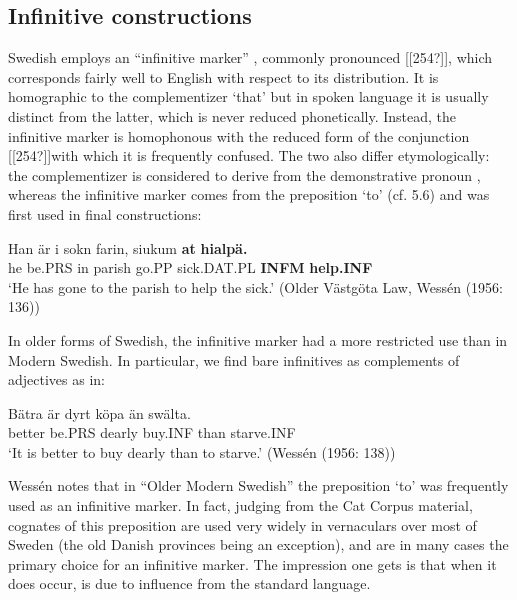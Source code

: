 \subsection{Infinitive constructions}
\label{bkm:Ref218337377}
Swedish employs an “infinitive marker” , commonly pronounced [[254?]], which corresponds fairly well to English with respect to its distribution. It is homographic to the complementizer  ‘that’ but in spoken language it is usually distinct from the latter, which is never reduced phonetically. Instead, the infinitive marker is homophonous with the reduced form of the conjunction [[254?]]\textstyleLinguisticExample{, }with which it is frequently confused. The two  also differ etymologically: the complementizer is considered to derive from the demonstrative pronoun , whereas the infinitive marker comes from the preposition  ‘to’ (cf. 5.6) and was first used in final constructions: 


\ea\label{}
\gll Han  är  i  sokn  farin,  siukum  \textbf{at} \textbf{hialpä.}\\
he  be.PRS  in  parish  go.PP  sick.DAT.PL  \textbf{INFM} \textbf{help.INF}\\
\glt ‘He has gone to the parish to help the sick.’ (Older Västgöta Law, Wessén (1956: 136)) 
\z

In older forms of Swedish, the infinitive marker had a more restricted use than in Modern Swedish. In particular, we find bare infinitives as complements of adjectives as in:


\ea\label{}
\gll Bätra  är  dyrt  köpa  än  swälta.  \\
better  be.PRS  dearly  buy.INF  than  starve.INF  \\
\glt ‘It is better to buy dearly than to starve.’ (Wessén (1956: 138))
\z

Wessén notes that in “Older Modern Swedish” the preposition  ‘to’ was frequently used as an infinitive marker. In fact, judging from the Cat Corpus material, cognates of this preposition are used very widely in vernaculars over most of Sweden (the old Danish provinces being an exception), and are in many cases the primary choice for an infinitive marker. The impression one gets is that when it does occur, is due to influence from the standard language. 

